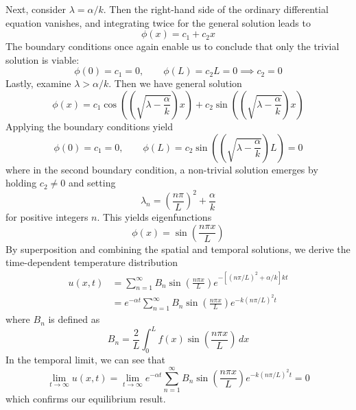 \documentclass[a4paper]{article}
\begin{document}
\begin{enumerate}[label=(\alph*)]
	Next, consider \( \lambda = \alpha / k \). Then the right-hand side of the ordinary differential equation vanishes, and integrating twice for the general solution leads to
	\[
		\phi \!\left( x \right) = c_{1} + c_{2}x 
	\]
	The boundary conditions once again enable us to conclude that only the trivial solution is viable:
	\[
		\phi \!\left( 0 \right) = c_{1} = 0, \qquad \phi \!\left( L \right) = c_{2}L = 0 \implies c_{2} = 0
	\]
	Lastly, examine \( \lambda > \alpha / k \). Then we have general solution
	\[
		\phi \!\left( x \right) = c_{1}\cos\!\left(\!\left(\sqrt{\lambda - \frac{\alpha}{k}}\right)x\right) + c_{2}\sin\!\left(\!\left(\sqrt{\lambda - \frac{\alpha}{k}}\right)x\right) 
	\]
	Applying the boundary conditions yield
	\[
		\phi \!\left( 0 \right) = c_{1} = 0, \qquad \phi \!\left( L \right) = c_{2}\sin\!\left(\!\left( \sqrt{\lambda - \frac{\alpha}{k}} \right)L\right) = 0
	\]
	where in the second boundary condition, a non-trivial solution emerges by holding \( c_{2} \neq 0 \) and setting
	\[
		\lambda_{n} = \!\left( \frac{n \pi}{L} \right)^{2} + \frac{\alpha}{k} 
	\]
	for positive integers \( n \). This yields eigenfunctions
	\[
		\phi \!\left( x \right) = \sin\!\left(\frac{n \pi x}{L}\right) 
	\]
	By superposition and combining the spatial and temporal solutions, we derive the time-dependent temperature distribution
	\begin{align*}
		u \!\left( x,t \right) & = \sum^{\infty}_{n=1} B_{n}\sin\!\left(\frac{n \pi x}{L}\right)e^{-\!\left[ \!\left( n \pi / L \right)^{2} + \alpha / k \right]kt} \\
				       & = e^{-\alpha t}\sum^{\infty}_{n=1} B_{n}\sin\!\left(\frac{n \pi x}{L}\right)e^{-k \!\left( n \pi / L \right)^{2}t} 
	\end{align*}
	where \( B_{n} \) is defined as 
	\[
		B_{n} = \frac{2}{L}\int^{L}_{0} f \!\left( x \right)\sin\!\left(\frac{n \pi x}{L}\right) \, dx  
	\]
	In the temporal limit, we can see that
	\[
		\lim\limits_{t \to \infty} u \!\left( x,t \right) = \lim\limits_{t \to \infty} e^{-\alpha t}\sum^{\infty}_{n=1} B_{n}\sin\!\left(\frac{n \pi x}{L}\right)e^{-k \!\left( n \pi / L \right)^{2}t} = 0
	\]
	which confirms our equilibrium result.
\end{enumerate}

\end{document}

